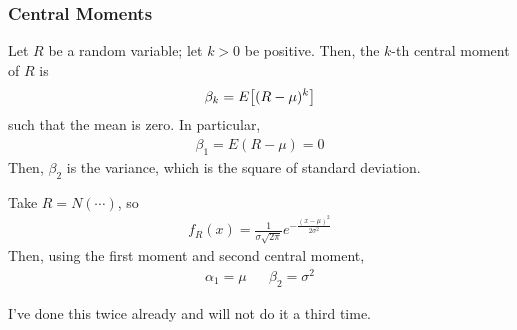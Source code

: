 \subsubsection{Central Moments}
\begin{definition}
    Let $R$ be a random variable; let $k > 0$ be positive. Then, the $k$-th central moment of $R$ is
    \begin{align}
        \beta_k = E\qty[(R - \mu)^k]
    \end{align}
    such that the mean is zero. In particular,
    \begin{align}
        \beta_1 = E(R - \mu) = 0
    \end{align}
    Then, $\beta_2$ is the variance, which is the square of standard deviation.
\end{definition}
\begin{example}
    Take $R = N(\cdots)$, so
    \begin{align}
        f_R(x) = \frac{1}{\sigma\sqrt{2\pi}} e^{-\frac{(x-\mu)^2}{2\sigma^2}}
    \end{align}
    Then, using the first moment and second central moment,
    \begin{align}
        \alpha_1 = \mu && \beta_2 = \sigma^2
    \end{align}
\end{example}
\begin{solution}
    I've done this twice already and will not do it a third time.
\end{solution}



